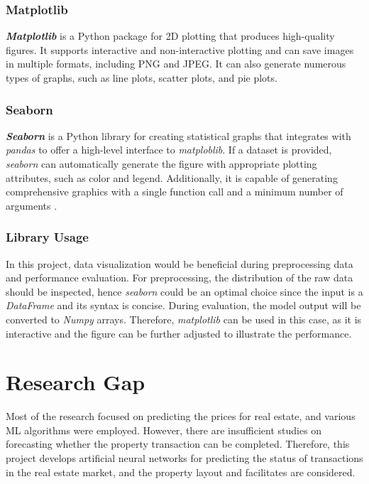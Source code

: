 \documentclass[12pt,twoside]{report}
\begin{document}
\subsubsection{Matplotlib}
\textbf{\textit{Matplotlib}} is a Python package for 2D plotting that produces high-quality figures. It supports interactive and non-interactive plotting and can save images in multiple formats, including PNG and JPEG. It can also generate numerous types of graphs, such as line plots, scatter plots, and pie plots.

\subsubsection{Seaborn}
\textbf{\textit{Seaborn}} is a Python library for creating statistical graphs that integrates with \textit{pandas} to offer a high-level interface to \textit{matploblib}. If a dataset is provided, \textit{seaborn} can automatically generate the figure with appropriate plotting attributes, such as color and legend. Additionally, it is capable of generating comprehensive graphics with a single function call and a minimum number of arguments \citep{RN16}.

\subsubsection{Library Usage}
In this project, data visualization would be beneficial during preprocessing data and performance evaluation. For preprocessing, the distribution of the raw data should be inspected, hence \textit{seaborn} could be an optimal choice since the input is a \textit{DataFrame} and its syntax is concise. During evaluation, the model output will be converted to \textit{Numpy} arrays. Therefore, \textit{matplotlib} can be used in this case, as it is interactive and the figure can be further adjusted to illustrate the performance. 

\section{Research Gap}
Most of the research focused on predicting the prices for real estate, and various ML algorithms were employed. However, there are insufficient studies on forecasting whether the property transaction can be completed. Therefore, this project develops artificial neural networks for predicting the status of transactions in the real estate market, and the property layout and facilitates are considered. 
\end{document}
